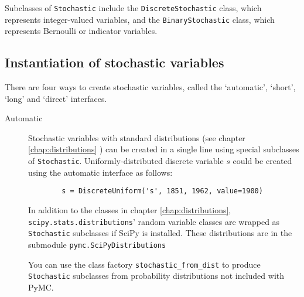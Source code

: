 Subclasses of \texttt{Stochastic} include the \texttt{DiscreteStochastic} class, which represents integer-valued variables, and the \texttt{BinaryStochastic} class, which represents Bernoulli or indicator variables. 

\subsection{Instantiation of stochastic variables}
There are four ways to create stochastic variables, called the `automatic', `short', `long' and `direct' interfaces.

\begin{description}    
    \item[Automatic] Stochastic variables with standard distributions (see chapter \ref{chap:distributions} ) can be created in a single line using special subclasses of \texttt{Stochastic}. Uniformly-distributed discrete variable $s$ could be created using the automatic interface as follows:
    \begin{verbatim}
        s = DiscreteUniform('s', 1851, 1962, value=1900)
    \end{verbatim}

    In addition to the classes in chapter \ref{chap:distributions}, \texttt{scipy.stats.distributions}' random variable classes are wrapped as \texttt{Stochastic} subclasses if SciPy is installed. These distributions are in the submodule \texttt{pymc.SciPyDistributions}

    You can use the class factory \texttt{stochastic_from_dist} to produce \texttt{Stochastic} subclasses from probability distributions not included with PyMC.%
    

\end{description}
